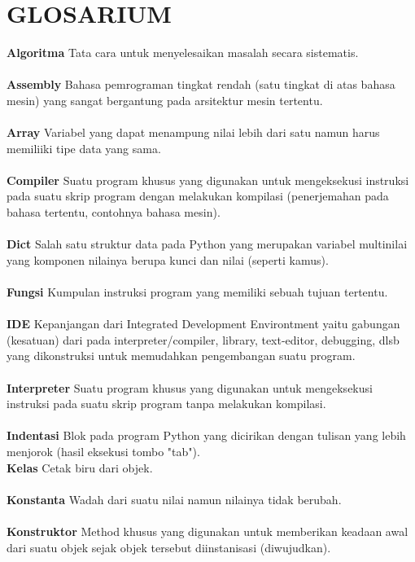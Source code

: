 \chapter{GLOSARIUM}
\textbf{Algoritma} Tata cara untuk menyelesaikan masalah secara sistematis.\\ \\
\textbf{Assembly}  Bahasa pemrograman tingkat rendah (satu tingkat di atas bahasa mesin) yang sangat bergantung pada arsitektur mesin tertentu. \\ \\
\textbf{Array}  Variabel yang dapat menampung nilai lebih dari satu namun harus memiliiki tipe data yang sama. \\ \\
\textbf{Compiler} Suatu program khusus yang digunakan untuk mengeksekusi instruksi pada suatu skrip program dengan melakukan kompilasi (penerjemahan pada bahasa tertentu, contohnya bahasa mesin). \\ \\
\textbf{Dict} Salah satu struktur data pada Python yang merupakan variabel multinilai yang komponen nilainya berupa kunci dan nilai (seperti kamus). \\ \\
\textbf{Fungsi} Kumpulan instruksi program yang memiliki sebuah tujuan tertentu. \\ \\
\textbf{IDE} Kepanjangan dari Integrated Development Environtment yaitu gabungan (kesatuan) dari pada interpreter/compiler, library, text-editor, debugging, dlsb yang dikonstruksi untuk memudahkan pengembangan suatu program.\\ \\
\textbf{Interpreter} Suatu program khusus yang digunakan untuk mengeksekusi instruksi pada suatu skrip program tanpa melakukan kompilasi.\\ \\
\textbf{Indentasi} Blok pada program Python yang dicirikan dengan tulisan yang lebih menjorok (hasil eksekusi tombo "tab"). \\
\textbf{Kelas} Cetak biru dari objek.\\ \\
\textbf{Konstanta} Wadah dari suatu nilai namun nilainya tidak berubah.\\ \\
\textbf{Konstruktor} Method khusus yang digunakan untuk memberikan keadaan awal dari suatu objek sejak objek tersebut diinstanisasi (diwujudkan).\\ \\
